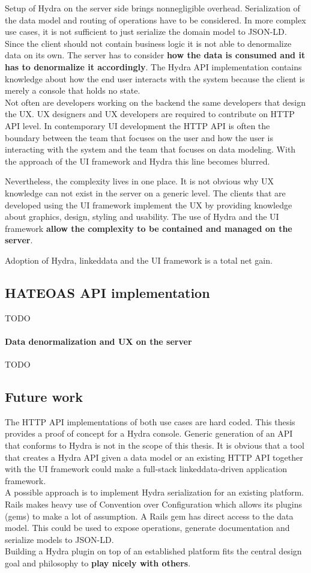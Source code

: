 Setup of Hydra on the server side brings nonnegligible overhead. Serialization of the data model and routing of operations have to be considered. In more complex use cases, it is not sufficient to just serialize the domain model to JSON-LD. Since the client should not contain business logic it is not able to denormalize data on its own. The server has to consider \textbf{how the data is consumed and it has to denormalize it accordingly}. The Hydra API implementation contains knowledge about how the end user interacts with the system because the client is merely a console that holds no state. \\
Not often are developers working on the backend the same developers that design the UX. UX designers and UX developers are required to contribute on HTTP API level. In contemporary UI development the HTTP API is often the boundary between the team that focuses on the user and how the user is interacting with the system and the team that focuses on data modeling. With the approach of the UI framework and Hydra this line becomes blurred.

Nevertheless, the complexity lives in one place. It is not obvious why UX knowledge can not exist in the server on a generic level. The clients that are developed using the UI framework implement the UX by providing knowledge about graphics, design, styling and usability. The use of Hydra and the UI framework \textbf{allow the complexity to be contained and managed on the server}.

Adoption of Hydra, \gls{linkeddata} and the UI framework is a total net gain.

\subsection{HATEOAS API implementation}
TODO
\paragraph{Data denormalization and UX on the server}
TODO

\subsection{Future work}
The HTTP API implementations of both use cases are hard coded. This thesis provides a proof of concept for a Hydra console. Generic generation of an API that conforms to Hydra is not in the scope of this thesis. It is obvious that a tool that creates a Hydra API given a data model or an existing HTTP API together with the UI framework could make a full-stack \gls{linkeddata}-driven application framework. \\
A possible approach is to implement Hydra serialization for an existing platform. Rails makes heavy use of Convention over Configuration which allows its plugins (gems) to make a lot of assumption. A Rails gem has direct access to the data model. This could be used to expose operations, generate documentation and serialize models to JSON-LD. \\
Building a Hydra plugin on top of an established platform fits the central design goal and philosophy to \textbf{play nicely with others}.
